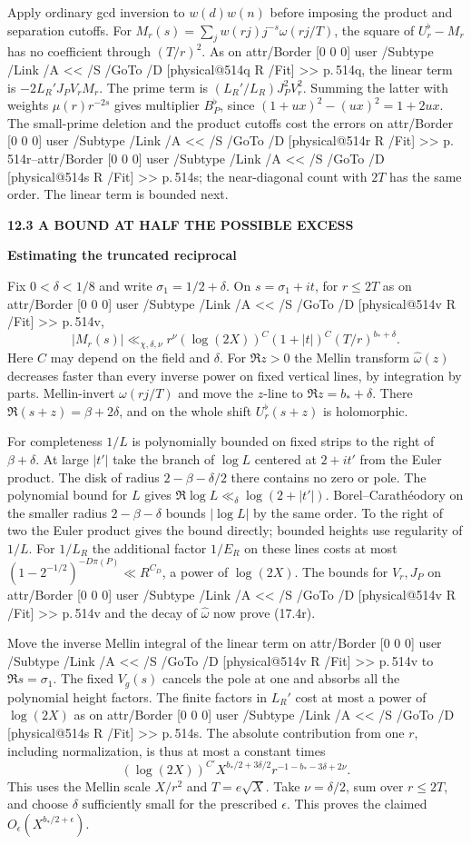 \documentclass[11pt,letterpaper]{article}
\makeatletter
\newcommand{\rightmarktext}{}
\newcommand{\printfolio}{}
\newcommand{\leaf}[4]{\clearpage\gdef\printfolio{#1}\gdef\rightmarktext{#2}%
  {\small\sffamily\bfseries\color{ink}#3\par}\vspace{3pt}%
  {\LARGE\bfseries #4\par}\vspace{5pt}}
\newcommand{\MusicPDFPageRef}[1]{\pdfpageref\csname physical@#1\endcsname\space\space 0 R}
\newcommand{\pagelink}[2]{\leavevmode\pdfstartlink attr{/Border [0 0 0]} user{%
  /Subtype /Link /A << /S /GoTo /D [\MusicPDFPageRef{#1} /Fit] >>}%
  {\color{ink}#2}\pdfendlink}
\newcommand{\pg}[1]{\pagelink{#1}{p.\,#1}}
\makeatother
\begin{document}
Apply ordinary gcd inversion to $w(d)w(n)$ before imposing the product
and separation cutoffs. For $M_r(s)=\sum_j w(rj)j^{-s}\omega(rj/T)$,
the square of $U_r^\flat-M_r$ has no coefficient through $(T/r)^2$.
As on \pg{514q}, the linear term is $-2L_R'J_P V_rM_r$. The prime
term is $(L_R'/L_R)J_P^2 V_r^2$. Summing the latter with weights
$\mu(r)r^{-2s}$ gives multiplier $B_P^\flat$, since
$(1+u x)^2-(u x)^2=1+2u x$. The small-prime deletion and the product
cutoffs cost the errors on \pg{514r}--\pg{514s}; the near-diagonal
count with $2T$ has the same order. The linear term is bounded next.

\leaf{514w}{The smoothed linear term}{12.3 \quad A BOUND AT HALF THE POSSIBLE EXCESS}{Estimating the truncated reciprocal}
Fix $0<\delta<1/8$ and write $\sigma_1=1/2+\delta$. On
$s=\sigma_1+it$, for $r\le2T$ as on \pg{514v},
\[
 |M_r(s)|\ll_{\chi,\delta,\nu} r^\nu(\log(2X))^{C}
     (1+|t|)^C (T/r)^{b_*+\delta}.
 \tag{17.4r}
\]
Here $C$ may depend on the field and $\delta$. For $\Re z>0$ the
Mellin transform $\widehat\omega(z)$ decreases faster than every
inverse power on fixed vertical lines, by integration by parts.
Mellin-invert $\omega(rj/T)$ and move the $z$-line to
$\Re z=b_*+\delta$. There $\Re(s+z)=\beta+2\delta$, and on the
whole shift $U_r^\flat(s+z)$ is holomorphic.

For completeness $1/L$ is polynomially bounded on fixed strips to
the right of $\beta+\delta$. At large $|t'|$ take the branch of
$\log L$ centered at $2+it'$ from the Euler product. The disk of
radius $2-\beta-\delta/2$ there contains no zero or pole. The
polynomial bound for $L$ gives $\Re\log L\ll_\delta\log(2+|t'|)$.
Borel--Carath\'eodory on the smaller radius $2-\beta-\delta$ bounds
$|\log L|$ by the same order. To the right of two the Euler product
gives the bound directly; bounded heights use regularity of $1/L$.
For $1/L_R$ the additional factor $1/E_R$ on these lines costs at
most $(1-2^{-1/2})^{-D\pi(P)}\ll R^{C_D}$, a power of $\log(2X)$.
The bounds for $V_r,J_P$ on \pg{514v} and the decay of
$\widehat\omega$ now prove (17.4r).

Move the inverse Mellin integral of the linear term on \pg{514v}
to $\Re s=\sigma_1$. The fixed $V_g(s)$ cancels the pole at one
and absorbs all the polynomial height factors. The finite factors
in $L_R'$ cost at most a power of $\log(2X)$ as on \pg{514s}.
The absolute contribution from one $r$, including normalization,
is thus at most a constant times
\[
 (\log(2X))^{C'}X^{b_*/2+3\delta/2}
                  r^{-1-b_*-3\delta+2\nu}.
\]
This uses the Mellin scale $X/r^2$ and $T=e\sqrt X$. Take
$\nu=\delta/2$, sum over $r\le2T$, and choose $\delta$ sufficiently
small for the prescribed $\epsilon$. This proves the claimed
$O_\epsilon(X^{b_*/2+\epsilon})$.
\end{document}
